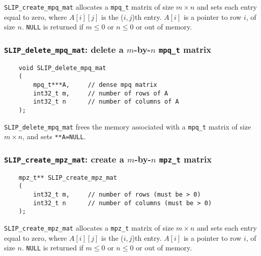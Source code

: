 \documentclass[12pt]{article}
\theoremstyle{definition}
\begin{document}
\verb|SLIP_create_mpq_mat| allocates a \verb|mpq_t| matrix of size $m \times n$
and sets each entry equal to zero, where $A[i][j]$ is the ($i,j$)th entry.
$A[i]$ is a pointer to row $i$, of size $n$. \verb|NULL| is returned if
$m \le 0 $ or $n\le 0$ or out of memory.


\cprotect\subsubsection{\verb|SLIP_delete_mpq_mat|: delete a $m$-by-$n$ \verb|mpq_t| matrix}

\begin{mdframed}[userdefinedwidth=6in]
{\footnotesize
\begin{verbatim}
    void SLIP_delete_mpq_mat
    (
        mpq_t***A,     // dense mpq matrix
        int32_t m,     // number of rows of A
        int32_t n      // number of columns of A
    );
\end{verbatim}
} \end{mdframed}


\verb|SLIP_delete_mpq_mat| frees the memory associated with a \verb|mpq_t|
matrix of size $m \times n$, and sets \verb|**A=NULL|.

\cprotect\subsubsection{\verb|SLIP_create_mpz_mat|: create a $m$-by-$n$ \verb|mpz_t| matrix}

\begin{mdframed}[userdefinedwidth=6in]
{\footnotesize
\begin{verbatim}
    mpz_t** SLIP_create_mpz_mat
    (
        int32_t m,     // number of rows (must be > 0)
        int32_t n      // number of columns (must be > 0)
    );
\end{verbatim}
} \end{mdframed}

\verb|SLIP_create_mpz_mat| allocates a \verb|mpz_t| matrix of size $m \times n$
and sets each entry equal to zero, where $A[i][j]$ is the ($i,j$)th entry.
$A[i]$ is a pointer to row $i$, of size $n$. \verb|NULL| is returned if
$m \le 0 $ or $n\le 0$ or out of memory.
\end{document}
